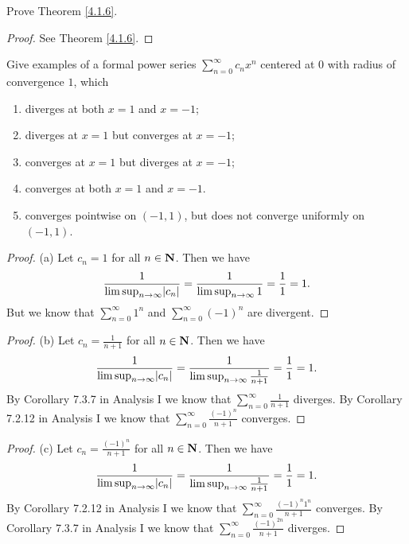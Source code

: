 \begin{exercise}\label{ex 4.1.1}
    Prove Theorem \ref{4.1.6}.
\end{exercise}

\begin{proof}
    See Theorem \ref{4.1.6}.
\end{proof}

\begin{exercise}\label{ex 4.1.2}
    Give examples of a formal power series \(\sum_{n = 0}^\infty c_n x^n\) centered at \(0\) with radius of convergence \(1\), which
    \begin{enumerate}
        \item diverges at both \(x = 1\) and \(x = -1\);
        \item diverges at \(x = 1\) but converges at \(x = -1\);
        \item converges at \(x = 1\) but diverges at \(x = -1\);
        \item converges at both \(x = 1\) and \(x = -1\).
        \item converges pointwise on \((-1, 1)\), but does not converge uniformly on \((-1, 1)\).
    \end{enumerate}
\end{exercise}

\begin{proof}{(a)}
    Let \(c_n = 1\) for all \(n \in \mathbf{N}\).
    Then we have
    \[
        \frac{1}{\limsup_{n \to \infty} \abs{c_n}} = \frac{1}{\limsup_{n \to \infty} 1} = \frac{1}{1} = 1.
    \]
    But we know that \(\sum_{n = 0}^\infty 1^n\) and \(\sum_{n = 0}^\infty (-1)^n\) are divergent.
\end{proof}

\begin{proof}{(b)}
    Let \(c_n = \frac{1}{n + 1}\) for all \(n \in \mathbf{N}\).
    Then we have
    \[
        \frac{1}{\limsup_{n \to \infty} \abs{c_n}} = \frac{1}{\limsup_{n \to \infty} \frac{1}{n + 1}} = \frac{1}{1} = 1.
    \]
    By Corollary 7.3.7 in Analysis I we know that \(\sum_{n = 0}^\infty \frac{1}{n + 1}\) diverges.
    By Corollary 7.2.12 in Analysis I we know that \(\sum_{n = 0}^\infty \frac{(-1)^n}{n + 1}\) converges.
\end{proof}

\begin{proof}{(c)}
    Let \(c_n = \frac{(-1)^n}{n + 1}\) for all \(n \in \mathbf{N}\).
    Then we have
    \[
        \frac{1}{\limsup_{n \to \infty} \abs{c_n}} = \frac{1}{\limsup_{n \to \infty} \frac{1}{n + 1}} = \frac{1}{1} = 1.
    \]
    By Corollary 7.2.12 in Analysis I we know that \(\sum_{n = 0}^\infty \frac{(-1)^n 1^n}{n + 1}\) converges.
    By Corollary 7.3.7 in Analysis I we know that \(\sum_{n = 0}^\infty \frac{(-1)^{2n}}{n + 1}\) diverges.
\end{proof}

